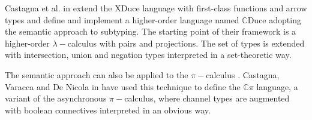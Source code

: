\documentclass[runningheads]{llncs}
\begin{document}
Castagna et al. in \cite{gentle,Cas05,FCB08} extend the XDuce language with first-class functions and arrow types and define and implement a higher-order language named $\mathbb{C}$Duce adopting the semantic approach to subtyping. The starting point of their framework is a higher-order $\lambda-$calculus with pairs and projections. The set of types is extended with intersection, union and negation types interpreted in a set-theoretic way.

The semantic approach can also be applied to the $\pi-$calculus \cite{milner,sangiorgi}. Castagna, Varacca and De Nicola in \cite{Cpi} have used this technique to define the $\mathbb{C}\pi$ language, a variant of the asynchronous $\pi-$calculus, where channel types are augmented with boolean connectives interpreted in an obvious way.


\newpage


\end{document}
